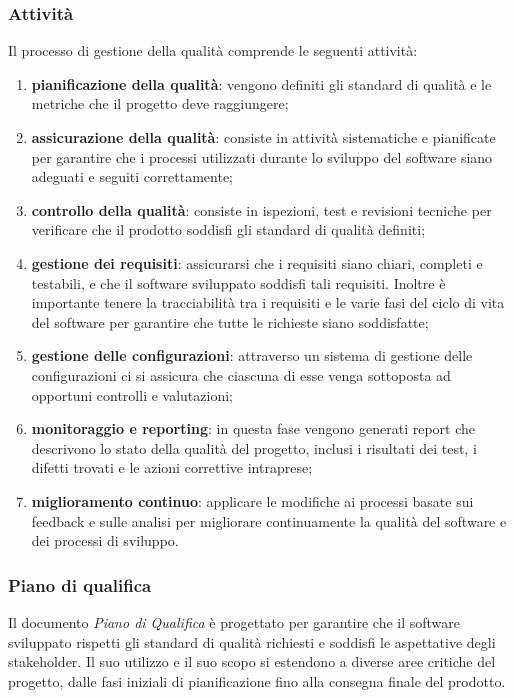 \subsubsection{Attività}
Il processo di gestione della qualità comprende le seguenti attività:
\begin{enumerate}
	\item \textbf{pianificazione della qualità}: vengono definiti gli standard di qualità e le metriche che il progetto deve raggiungere;
	\item \textbf{assicurazione della qualità}: consiste in attività sistematiche e pianificate per garantire che i processi utilizzati durante lo sviluppo del software siano adeguati e seguiti correttamente;
	\item \textbf{controllo della qualità}: consiste in ispezioni, test e revisioni tecniche per verificare che il prodotto soddisfi gli standard di qualità definiti;
	\item \textbf{gestione dei requisiti}: assicurarsi che i requisiti siano chiari, completi e testabili, e che il software sviluppato soddisfi tali requisiti. Inoltre è importante tenere la tracciabilità tra i requisiti e le varie fasi del ciclo di vita del software per garantire che tutte le richieste siano soddisfatte;
	\item \textbf{gestione delle configurazioni}: attraverso un sistema di gestione delle configurazioni ci si assicura che ciascuna di esse venga sottoposta ad opportuni controlli e valutazioni;
	\item \textbf{monitoraggio e reporting}: in questa fase vengono generati report che descrivono lo stato della qualità del progetto, inclusi i risultati dei test, i difetti trovati e le azioni correttive intraprese;
	\item \textbf{miglioramento continuo}: applicare le modifiche ai processi basate sui feedback e sulle analisi per migliorare continuamente la qualità del software e dei processi di sviluppo.
\end{enumerate}

\subsubsection{Piano di qualifica}
Il documento \textit{Piano di Qualifica} è progettato per garantire che il software sviluppato rispetti gli standard di qualità richiesti e soddisfi le aspettative degli stakeholder. Il suo utilizzo e il suo scopo si estendono a diverse aree critiche del progetto, dalle fasi iniziali di pianificazione fino alla consegna finale del prodotto.

